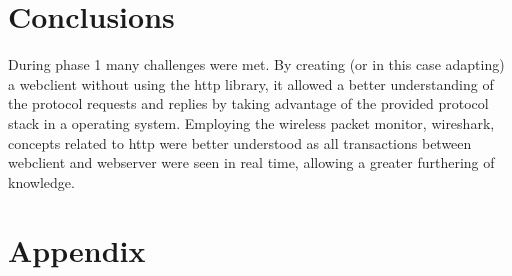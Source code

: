 \documentclass[11pt,a4paper]{report}
\begin{document}
\chapter{Conclusions}
During phase 1 many challenges were met.
By creating (or in this case adapting) a webclient without using the http library, it allowed a better understanding of the protocol requests and replies by taking advantage of the provided protocol stack in a operating system.
Employing the wireless packet monitor, wireshark, concepts related to http were better understood as all transactions between webclient and webserver were seen in real time, allowing a greater furthering of knowledge.

%
%

\appendix
\chapter{Appendix}
\end{document}
